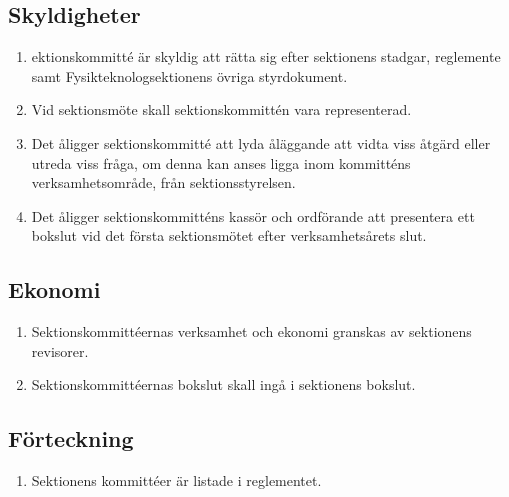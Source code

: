 \documentclass[11pt,a4paper]{article}
\begin{document}
\subsection{Skyldigheter}

\begin{enumerate}[\thesubsection .1]


    \item ektionskommitté är skyldig att rätta sig efter sektionens stadgar,  reglemente samt Fysikteknologsektionens övriga styrdokument.
  
  \item Vid sektionsmöte skall sektionskommittén vara representerad.

  \item Det åligger sektionskommitté att lyda åläggande att vidta viss
  åtgärd eller utreda viss fråga, om denna kan anses ligga inom
  kommitténs verksamhetsområde, från sektionsstyrelsen.

  \item Det åligger sektionskommitténs kassör och ordförande att
  presentera ett bokslut vid det första sektionsmötet efter verksamhetsårets slut.

\end{enumerate}

\subsection{Ekonomi}

\begin{enumerate}[\thesubsection .1]

  \item Sektionskommittéernas verksamhet och ekonomi granskas av
  sektionens revisorer.

  \item Sektionskommittéernas bokslut skall ingå i sektionens bokslut.

\end{enumerate}

\subsection{Förteckning}

\begin{enumerate}[\thesubsection .1]

  \item Sektionens kommittéer är listade i reglementet.

\end{enumerate}
\end{document}
